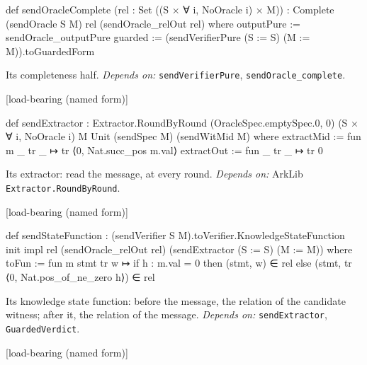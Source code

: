 \begin{leancode}
def sendOracleComplete (rel : Set ((S × ∀ i, NoOracle i) × M)) :
    Complete (sendOracle S M) rel (sendOracle_relOut rel) where
  outputPure := sendOracle_outputPure
  guarded := (sendVerifierPure (S := S) (M := M)).toGuardedForm
\end{leancode}


Its completeness half. \emph{Depends on:} \texttt{sendVerifierPure}, \texttt{sendOracle\_\allowbreak{}complete}.

\par\medskip\noindent\textbf{}\hfill\textsf{\small [load-bearing (named form)]}\par\nopagebreak

\begin{leancode}
def sendExtractor : Extractor.RoundByRound (OracleSpec.emptySpec.{0, 0}) (S × ∀ i, NoOracle i) M
    Unit (sendSpec M) (sendWitMid M) where
  extractMid := fun m _ tr _ ↦ tr ⟨0, Nat.succ_pos m.val⟩
  extractOut := fun _ tr _ ↦ tr 0
\end{leancode}


Its extractor: read the message, at every round. \emph{Depends on:} ArkLib \texttt{Extractor.\allowbreak{}RoundByRound}.

\par\medskip\noindent\textbf{}\hfill\textsf{\small [load-bearing (named form)]}\par\nopagebreak

\begin{leancode}
def sendStateFunction :
    (sendVerifier S M).toVerifier.KnowledgeStateFunction init impl rel (sendOracle_relOut rel)
      (sendExtractor (S := S) (M := M)) where
  toFun := fun m stmt tr w ↦
    if h : m.val = 0 then (stmt, w) ∈ rel else (stmt, tr ⟨0, Nat.pos_of_ne_zero h⟩) ∈ rel
\end{leancode}


Its knowledge state function: before the message, the relation of the candidate witness; after it, the relation of the message. \emph{Depends on:} \texttt{sendExtractor}, \texttt{GuardedVerdict}.

\par\medskip\noindent\textbf{}\hfill\textsf{\small [load-bearing (named form)]}\par\nopagebreak


